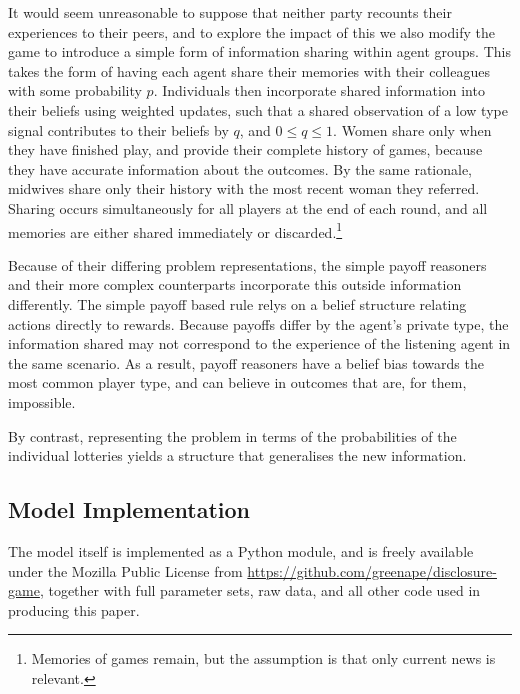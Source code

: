 It would seem unreasonable to suppose that neither party recounts their experiences to their peers, and to explore the impact of this we also modify the game to introduce a simple form of information sharing within agent groups. This takes the form of having each agent share their memories with their colleagues with some probability \(p\). Individuals then incorporate shared information into their beliefs using weighted updates, such that a shared observation of a low type signal contributes to their beliefs by \(q\), and \(0\leq q\leq 1\). Women share only when they have finished play, and provide their complete history of games, because they have accurate information about the outcomes. By the same rationale, midwives share only their history with the most recent woman they referred. Sharing occurs simultaneously for all players at the end of each round, and all memories are either shared immediately or discarded.\footnote{Memories of games remain, but the assumption is that only current news is relevant.}

Because of their differing problem representations, the simple payoff reasoners and their more complex counterparts incorporate this outside information differently. The simple payoff based rule relys on a belief structure relating actions directly to rewards. Because payoffs differ by the agent's private type, the information shared may not correspond to the experience of the listening agent in the same scenario. As a result, payoff reasoners have a belief bias towards the most common player type, and can believe in outcomes that are, for them, impossible.

By contrast, representing the problem in terms of the probabilities of the individual lotteries yields a structure that generalises the new information.

\subsection{Model Implementation}
\label{sub:the_code}
The model itself is implemented as a Python module, and is freely available under the Mozilla Public License from \url{https://github.com/greenape/disclosure-game}, together with full parameter sets, raw data, and all other code used in producing this paper.